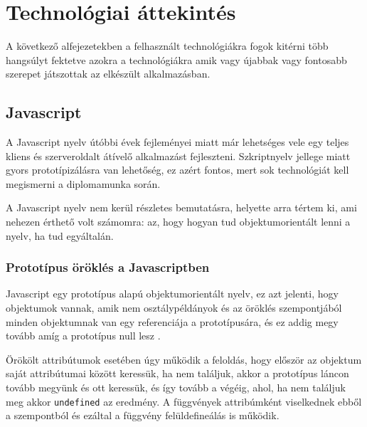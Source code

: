 



\chapter{Technológiai áttekintés}
A következő alfejezetekben a felhasznált technológiákra fogok kitérni több hangsúlyt fektetve azokra a technológiákra amik vagy újabbak vagy fontosabb szerepet játszottak az elkészült alkalmazásban.

\section{Javascript}


A Javascript nyelv útóbbi évek fejleményei miatt már lehetséges vele egy teljes kliens és szerveroldalt átívelő alkalmazást fejleszteni. Szkriptnyelv jellege miatt gyors prototípizálásra van lehetőség, ez azért fontos, mert sok technológiát kell megismerni a diplomamunka során.

A Javascript nyelv nem kerül részletes bemutatásra, helyette arra tértem ki, ami nehezen érthető volt számomra: az, hogy hogyan tud objektumorientált lenni a nyelv, ha tud egyáltalán. 

\subsection{Prototípus öröklés a Javascriptben}

Javascript egy prototípus alapú objektumorientált nyelv, ez azt jelenti, hogy objektumok vannak, amik nem osztálypéldányok és az öröklés szempontjából minden objektumnak van egy referenciája a prototípusára, és ez addig megy tovább amíg a prototípus null lesz \cite{mdnprotoref}. 

Örökölt attribútumok esetében úgy működik a feloldás, hogy először az objektum saját attribútumai között keressük, ha nem találjuk, akkor a prototípus láncon tovább megyünk és ott keressük, és így tovább a végéig, ahol, ha nem találjuk meg akkor \lstinline{undefined} az eredmény. A függvények attribúmként viselkednek ebből a szempontból és ezáltal a függvény felüldefineálás is működik.

